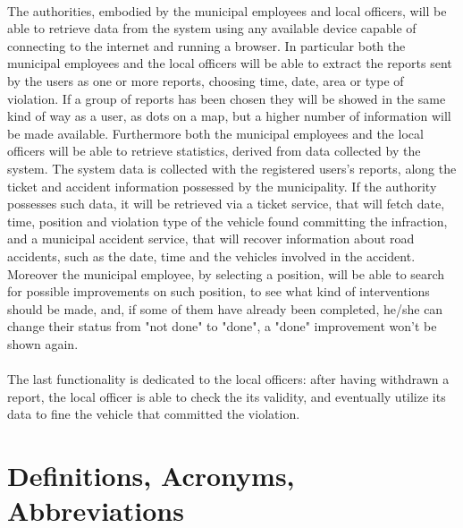 			\paragraph{}
				The authorities, embodied by the municipal employees and local officers, will be able to retrieve data from the system using any available device capable of connecting to the internet and running a browser. In particular both the municipal employees and the local officers will be able to extract the reports sent by the users as one or more reports, choosing time, date, area or type of violation. If a group of reports has been chosen they will be showed in the same kind of way as a user, as dots on a map, but a higher number of information will be made available. Furthermore both the municipal employees and the local officers will be able to retrieve statistics, derived from data collected by the system. The system data is collected with the registered users's reports, along the ticket and accident information possessed by the municipality. If the authority possesses such data, it will be retrieved via a ticket service, that will fetch date, time, position and violation type of the vehicle found committing the infraction, and a municipal accident service, that will recover information about road accidents, such as the date, time and the vehicles involved in the accident. Moreover the municipal employee, by selecting a position, will be able to search for possible improvements on such position, to see what kind of interventions should be made, and, if some of them have already been completed, he/she can change their status from "not done" to "done", a "done" improvement won't be shown again.
			\paragraph{}
				The last functionality is dedicated to the local officers: after having withdrawn a report, the local officer is able to check the its validity, and eventually utilize its data to fine the vehicle that committed the violation.
		\section{Definitions, Acronyms, Abbreviations}
